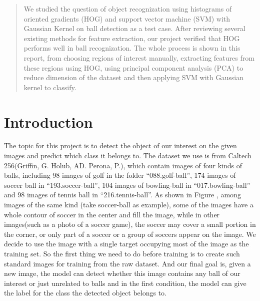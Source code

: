 \documentclass{article}
\begin{document}
 


\begin{abstract} 
We studied the question of object recognization using histograms of oriented gradients (HOG) and support vector machine (SVM) with Gaussian Kernel on ball detection as a test case. After reviewing several existing methods for feature extraction, our project verified that HOG performs well in ball recognization. The whole process is shown in this report, from choosing regions of interest manually, extracting features from these regions using HOG, using principal component analysis (PCA) to reduce dimension of the  dataset and then applying SVM with Gaussian kernel to classify.   
\end{abstract}


\section{Introduction}
The topic for this project is to detect the object of our interest on the given images and predict which class it belongs to. The dataset we use is from Caltech 256(Griffin, G. Holub, AD. Perona, P.), which contain images of four kinds of balls, including 98 images of golf in the folder ``088.golf-ball'', 174 images of soccer ball in ``193.soccer-ball'', 104 images of bowling-ball in ``017.bowling-ball'' and 98 images of tennis ball in ``216.tennis-ball''. As shown in Figure \cite{ROIResult}, among images of the same kind (take soccer-ball as example), some of the images have a whole contour of soccer in the center and fill the image, while in other images(such as a photo of a soccer game), the soccer may cover a small portion in the corner, or only part of a soccer or a group of soccers appear on the image. We decide to use the image with a single target occupying most of the image as the training set. So the first thing we need to do before training is to create such standard images for training from the raw dataset. And our final goal is, given a new image,  the model can detect whether this image contains any ball of our interest or just unrelated to balls and in the first condition, the model can give the label for the class the detected object belongs to.
\end{document}
